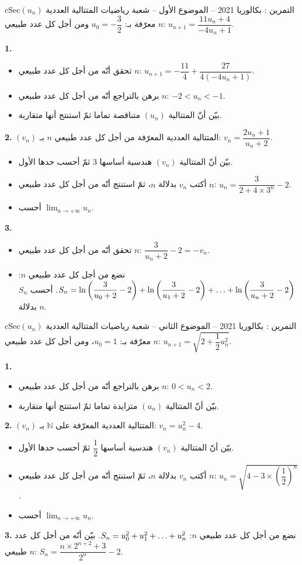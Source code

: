 \documentclass[12pt,a4paper]{article}
\newenvironment{BOX}[2]{\begin{otherlanguage}{english}\begin{arbox}{#1}{#2}}{\end{arbox}\end{otherlanguage}}
\newcounter{exo}
\newenvironment{tamrin}[1]{\stepcounter{exo}\begin{BOX}{cSec}{التمرين \theexo: #1}}{\end{BOX}}
\renewcommand{\dots}{\mathinner{\ldotp\ldotp\ldotp}}
\newcommand{\N}{\mathbb{N}}
\newcommand{\limn}{\displaystyle\lim_{n\to+\infty}}
\newenvironment{sq}{\begin{itemize}[leftmargin=2.4em,itemsep=3pt]}{\end{itemize}}
\newcommand{\qa}{\item[(أ)]}\newcommand{\qb}{\item[(ب)]}\newcommand{\qc}{\item[(جـ)]}\newcommand{\qd}{\item[(د)]}\newcommand{\qe}{\item[(هـ)]}
\newcommand{\QQ}[1]{\par\smallskip\textbf{#1.} }
\begin{document}
\begin{tamrin}{بكالوريا 2021 -- الموضوع الأول -- شعبة رياضيات}
المتتالية العددية $(u_n)$ معرّفة بـ: $u_0=-\dfrac32$ ومن أجل كل عدد طبيعي $n$: $u_{n+1}=\dfrac{11u_n+4}{-4u_n+1}$.
\QQ{1}
\begin{sq}
\qa تحقق أنّه من أجل كل عدد طبيعي $n$: $u_{n+1}=-\dfrac{11}{4}+\dfrac{27}{4(-4u_n+1)}$.
\qb برهن بالتراجع أنّه من أجل كل عدد طبيعي $n$: $-2<u_n<-1$.
\qc بيّن أنّ المتتالية $(u_n)$ متناقصة تماما ثمّ استنتج أنها متقاربة.
\end{sq}
\QQ{2} $(v_n)$ المتتالية العددية المعرّفة من أجل كل عدد طبيعي $n$ بـ: $v_n=\dfrac{2u_n+1}{u_n+2}$.
\begin{sq}
\qa بيّن أنّ المتتالية $(v_n)$ هندسية أساسها $3$ ثمّ أحسب حدها الأول.
\qb أكتب $v_n$ بدلالة $n$، ثمّ استنتج أنّه من أجل كل عدد طبيعي $n$: $u_n=\dfrac{3}{2+4\times 3^n}-2$.
\qc أحسب $\limn u_n$.
\end{sq}
\QQ{3}
\begin{sq}
\qa تحقق أنّه من أجل كل عدد طبيعي $n$: $\dfrac{3}{u_n+2}-2=-v_n$.
\qb نضع من أجل كل عدد طبيعي $n$: $S_n=\ln\left(\dfrac{3}{u_0+2}-2\right)+\ln\left(\dfrac{3}{u_1+2}-2\right)+\dots+\ln\left(\dfrac{3}{u_n+2}-2\right)$. أحسب $S_n$ بدلالة $n$.
\end{sq}
\end{tamrin}

\begin{tamrin}{بكالوريا 2021 -- الموضوع الثاني -- شعبة رياضيات}
المتتالية العددية $(u_n)$ معرّفة بـ: $u_0=1$، ومن أجل كل عدد طبيعي $n$: $u_{n+1}=\sqrt{2+\dfrac12u_n^2}$.
\QQ{1}
\begin{sq}
\qa برهن بالتراجع أنّه من أجل كل عدد طبيعي $n$: $0<u_n<2$.
\qb بيّن أنّ المتتالية $(u_n)$ متزايدة تماما ثمّ استنتج أنها متقاربة.
\end{sq}
\QQ{2} $(v_n)$ المتتالية العددية المعرّفة على $\N$ بـ: $v_n=u_n^2-4$.
\begin{sq}
\qa بيّن أنّ المتتالية $(v_n)$ هندسية أساسها $\dfrac12$ ثمّ أحسب حدها الأول.
\qb أكتب $v_n$ بدلالة $n$، ثمّ استنتج أنّه من أجل كل عدد طبيعي $n$: $u_n=\sqrt{4-3\times\left(\dfrac12\right)^n}$.
\qc أحسب $\limn u_n$.
\end{sq}
\QQ{3} نضع من أجل كل عدد طبيعي $n$: $S_n=u_0^2+u_1^2+\dots+u_n^2$.
بيّن أنّه من أجل كل عدد طبيعي $n$: $S_n=\dfrac{n\times 2^{n+2}+3}{2^n}-2$.
\end{tamrin}
\end{document}

